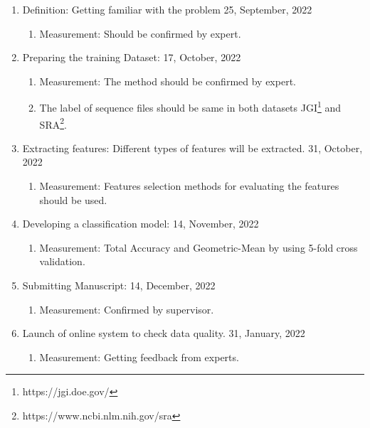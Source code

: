 \documentclass[a4paper]{article}
\newcommand{\deadline}[1]{{\color{blue} \hfill{#1} }}
\begin{document}
    \begin{enumerate}
        \item Definition: Getting familiar with the problem \deadline{25, September, 2022}
        \begin{enumerate}
            \item Measurement: Should be confirmed by expert.
        \end{enumerate}
        \item Preparing the training Dataset:\deadline{17, October, 2022}
        \begin{enumerate}
            \item Measurement: The method should be confirmed by expert.
            \item The label of sequence files should be same in both datasets JGI\footnote{https://jgi.doe.gov/} and SRA\footnote{https://www.ncbi.nlm.nih.gov/sra}.\@
        \end{enumerate}
        \item Extracting features: Different types of features will be extracted. \deadline{31, October, 2022}
        \begin{enumerate}
            \item Measurement: Features selection methods for evaluating the features should be used.
        \end{enumerate}
        \item Developing a classification model: \deadline{14, November, 2022}
        \begin{enumerate}
            \item Measurement: Total Accuracy and Geometric-Mean by using 5-fold cross validation.
        \end{enumerate}
        \item Submitting Manuscript: \deadline{14, December, 2022}
        \begin{enumerate}
            \item Measurement: Confirmed by supervisor.
        \end{enumerate}
        \item Launch of online system to check data quality. \deadline{31, January, 2022}
        \begin{enumerate}
            \item Measurement: Getting feedback from experts.
        \end{enumerate}
    \end{enumerate}
\end{document}
